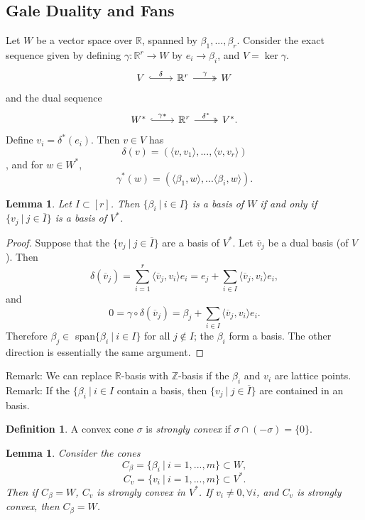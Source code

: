 \documentclass{article}
\newtheorem{lemma}[theorem]{Lemma}
\theoremstyle{definition}
\newtheorem{definition}[theorem]{Definition}
\theoremstyle{remark}
\numberwithin{theorem}{section}
\newcommand{\Z}{\mathbb{Z}}
\newenvironment{defn}{
	\begin{mdframed}
		\vspace{-0.5em}
		\begin{definition}
		}{
		\end{definition}
	\end{mdframed}
}
\begin{document}
	\subsection*{Gale Duality and Fans}
	Let $W$ be a vector space over $\mathbb{R}$, spanned by $\beta_1,...,\beta_r$. Consider the exact sequence given by defining $\gamma:\mathbb{R}^r\to W$ by $e_i\to \beta_i$, and $V=\ker\gamma$.
	\[\begin{tikzcd}
		V & {\mathbb{R}^r} & W
		\arrow["\delta", hook, from=1-1, to=1-2]
		\arrow["\gamma", two heads, from=1-2, to=1-3]
	\end{tikzcd}\]
	and the dual sequence
	\[\begin{tikzcd}
		{W^\ast} & {\mathbb{R}^r} & {V^\ast}
		\arrow["{\delta^\ast}", two heads, from=1-2, to=1-3]
		\arrow["\gamma\ast", hook, from=1-1, to=1-2].
	\end{tikzcd}\]
	Define $v_i = \delta^\ast(e_i)$. Then $v\in V$ has $$\delta(v) = \left(
	\langle v, v_1 \rangle, ... , \langle v, v_r \rangle 	
	\right)$$, and for $w\in W^\ast$, 
	$$\gamma^\ast(w) = (\langle \beta_1, w \rangle,...\langle \beta_i, w\rangle).$$
	\begin{lemma}
		Let $I\subset [r]$. Then $\{\beta_i ~|~ i\in I\}$ is a basis of $W$ if and only if $\{v_j ~|~ j\in \overline{I}\}$ is a basis of $V^\ast$.
	\end{lemma}
	\begin{proof}
		Suppose that the $\{v_j ~|~ j\in \overline{I}\}$ are a basis of $V^\ast$. Let $\overline{v}_j$ be a dual basis (of $V$). Then 
		$$\delta(\overline{v}_j) = \sum_{i=1}^r \langle \overline{v}_j, v_i\rangle e_i = e_j + \sum_{i\in I} \langle \overline{v}_j, v_i\rangle e_i,$$
	and $$0=\gamma\circ\delta(\overline{v}_j) = \beta_j + \sum_{i\in I} \langle \overline{v}_j, v_i\rangle e_i.$$
	Therefore $\beta_j \in$ span$\{\beta_i ~|~i\in I\}$ for all $j\not\in I$; the $\beta_i$ form a basis. The other direction is essentially the same argument.
	\end{proof}
	Remark: We can replace $\mathbb{R}$-basis with $\Z$-basis if the $\beta_i$ and $v_i$ are lattice points.\\
	Remark: If the $\{\beta_i ~|~ i \in I$ contain a basis, then $\{v_j ~|~ j\in\overline{I}\}$ are contained in an basis.

	\begin{defn}
		A convex cone $\sigma$ is \emph{strongly convex} if $\sigma \cap (-\sigma) = \{0\}$. 
	\end{defn}
	\begin{lemma}
		Consider the cones 
		$$C_\beta = \{\beta_i ~|~ i=1,...,m\} \subset W,$$
		$$C_v = \{v_i ~|~ i=1,...,m\} \subset V^\ast.$$
		Then if $C_\beta = W$, $C_v$ is strongly convex in $V^\ast$. If $v_i\neq 0, \forall i$,  and $C_v$ is strongly convex, then $C_\beta = W$.
	\end{lemma}
	
\end{document}
